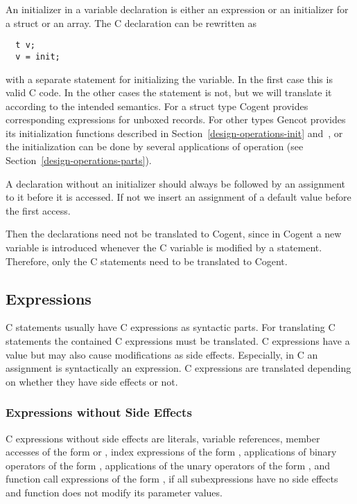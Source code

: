 An initializer  in a variable declaration  is either an expression or an initializer for
a struct or an array. The C declaration can be rewritten as
\begin{verbatim}
  t v;
  v = init;
\end{verbatim}
with a separate statement for initializing the variable. In the first case this is valid C code. In the other cases 
the statement is not, but we will translate it according to the intended semantics. For a struct type Cogent provides
corresponding expressions for unboxed records. For other types Gencot provides its initialization functions 
described in Section~\ref{design-operations-init} and~,
or the initialization can be done by several applications of operation  (see Section~\ref{design-operations-parts}).

A declaration without an initializer should always be followed by an assignment to it before it is accessed. If not
we insert an assignment of a default value before the first access.

Then the declarations need not be translated to Cogent, since in Cogent a new variable is introduced whenever
the C variable is modified by a statement. Therefore, only the C statements need to be translated to Cogent.

\subsection{Expressions}
\label{app-transfunction-expr}

C statements usually have C expressions as syntactic parts. For translating C statements the contained C expressions must be 
translated. C expressions have a value but may also cause modifications as side effects. Especially, in C an assignment
is syntactically an expression. C expressions are translated depending on whether they have side effects or not.

\subsubsection{Expressions without Side Effects}

C expressions without side effects are literals, variable references, member accesses of the form  or 
, index
expressions of the form , applications of binary operators of the form , 
applications of the unary operators \code{+,-,!,~} of the form , and function 
call expressions of the form , if all subexpressions
 have no side effects and function  does not modify its parameter values. 

